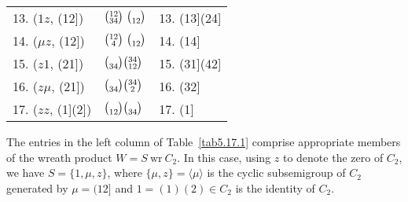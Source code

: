 \documentclass{surv-l}
\numberwithin{equation}{section}
\numberwithin{table}{section}
\numberwithin{figure}{section}
\theoremstyle{definition}
\begin{document}
\begin{table}[]
{\begin{tabular}{@{}|l|l|l|@{}}
13. ($1z$, (12])&$\big(\!\begin{smallmatrix}12 \\ 34\end{smallmatrix}\!\big)\ \big(\!\begin{smallmatrix}\vphantom{34}\\ 12\end{smallmatrix}\!\big)$&13. (13](24] \\[3pt]
14. ($\mu z$, (12])&$\big(\!\begin{smallmatrix}12 \\ 4\end{smallmatrix}\!\big)\ \big(\!\begin{smallmatrix}\vphantom{34}\\ 12\end{smallmatrix}\!\big)$&14. (14] \\[3pt]
15. ($z1$, (21])&$\big(\!\begin{smallmatrix} \vphantom{34}\\ 34\end{smallmatrix}\!\big) \big(\!\begin{smallmatrix}34 \\ 12\end{smallmatrix}\!\big)$&15. (31](42] \\[3pt]
16. ($z\mu$, (21])&$\big(\!\begin{smallmatrix}\vphantom{34}\\ 34\end{smallmatrix}\!\big) \big(\!\begin{smallmatrix}34 \\ 2\end{smallmatrix}\!\big)$&16. (32] \\[3pt]
17. ($zz$, (1](2])&$\big(\!\begin{smallmatrix}\vphantom{12} \\ 12\end{smallmatrix}\!\big) \big(\!\begin{smallmatrix}\vphantom{34}\\ 34\end{smallmatrix}\!\big)$&17. (1] \\[3pt]
\hline
\end{tabular}}{}
\end{table}

The entries in the left column of Table~\ref{tab5.17.1} comprise
appropriate members of the wreath product $W=S\ \mathrm{wr}\
C_{2}$. In this case, using $z$ to denote the zero of $C_{2}$, we
have $S =\{1,\mu,z\}$, where $\{\mu,z\}=\langle\mu\rangle$ is the
cyclic subsemigroup of $C_{2}$ generated by $\mu=(12]$ and
$1=(1)(2)\in C_{2}$ is the identity of $C_{2}$.
\end{document}
